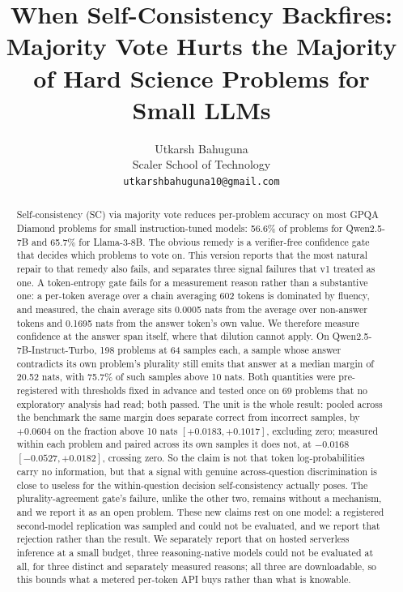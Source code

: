 \documentclass{article}
\title{When Self-Consistency Backfires: Majority Vote Hurts the Majority of Hard Science Problems for Small LLMs}
\author{Utkarsh Bahuguna \\
Scaler School of Technology \\
\texttt{utkarshbahuguna10@gmail.com}}
\begin{document}
\ifcolmsubmission
\linenumbers
\fi

\maketitle


\begin{abstract}
Self-consistency (SC) via majority vote reduces per-problem accuracy on most
GPQA Diamond problems for small instruction-tuned models: 56.6\% of problems
for Qwen2.5-7B and 65.7\% for Llama-3-8B. The obvious remedy is a
verifier-free confidence gate that decides which problems to vote on. This
version reports that the most natural repair to that remedy also fails, and
separates three signal failures that v1 treated as one. A token-entropy gate
fails for a measurement reason rather than a substantive one: a per-token
average over a chain averaging 602 tokens is dominated by fluency, and
measured, the chain average sits 0.0005 nats from the average over non-answer
tokens and 0.1695 nats from the answer token's own value. We therefore measure
confidence at the answer span itself, where that dilution cannot apply. On
Qwen2.5-7B-Instruct-Turbo, 198 problems at 64 samples each, a sample whose
answer contradicts its own problem's plurality still emits that answer at a
median margin of 20.52 nats, with 75.7\% of such samples above 10 nats. Both
quantities were pre-registered with thresholds fixed in advance and tested once
on 69 problems that no exploratory analysis had read; both passed. The unit is
the whole result: pooled across the benchmark the same margin does separate
correct from incorrect samples, by $+0.0604$ on the fraction above 10 nats
$[+0.0183, +0.1017]$, excluding zero; measured within each problem and paired
across its own samples it does not, at $-0.0168$ $[-0.0527, +0.0182]$, crossing
zero. So the claim is not that token log-probabilities carry no information,
but that a signal with genuine across-question discrimination is close to
useless for the within-question decision self-consistency actually poses. The
plurality-agreement gate's failure, unlike the other two, remains without a
mechanism, and we report it as an open problem. These new claims rest on one
model: a registered second-model replication was sampled and could not be
evaluated, and we report that rejection rather than the result. We separately
report that on hosted serverless inference at a small budget, three
reasoning-native models could not be evaluated at all, for three distinct and
separately measured reasons; all three are downloadable, so this bounds what a
metered per-token API buys rather than what is knowable.
\end{abstract}
\end{document}
